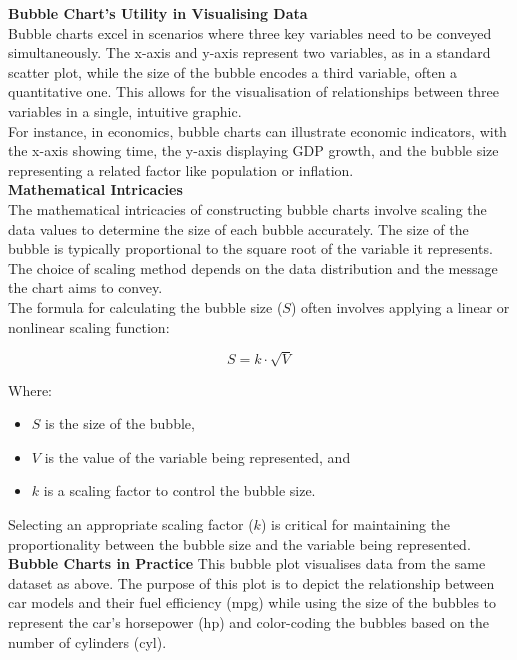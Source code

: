 \documentclass{article}\usepackage[]{graphicx}\usepackage[]{xcolor}
\begin{document}
\noindent
\textbf{Bubble Chart's Utility in Visualising Data}\\

\noindent
Bubble charts excel in scenarios where three key variables need to be conveyed simultaneously. The x-axis and y-axis represent two variables, as in a standard scatter plot, while the size of the bubble encodes a third variable, often a quantitative one. This allows for the visualisation of relationships between three variables in a single, intuitive graphic.\\

\noindent
For instance, in economics, bubble charts can illustrate economic indicators, with the x-axis showing time, the y-axis displaying GDP growth, and the bubble size representing a related factor like population or inflation.\\

\noindent
\textbf{Mathematical Intricacies}\\

\noindent
The mathematical intricacies of constructing bubble charts involve scaling the data values to determine the size of each bubble accurately. The size of the bubble is typically proportional to the square root of the variable it represents. The choice of scaling method depends on the data distribution and the message the chart aims to convey.\\

\noindent
The formula for calculating the bubble size (\(S\)) often involves applying a linear or nonlinear scaling function:

\[
S = k \cdot \sqrt{V}
\]

Where:
\begin{itemize}
\item \(S\) is the size of the bubble,
\item \(V\) is the value of the variable being represented, and
\item \(k\) is a scaling factor to control the bubble size.
\end{itemize}

Selecting an appropriate scaling factor (\(k\)) is critical for maintaining the proportionality between the bubble size and the variable being represented.\\

\noindent
\textbf{Bubble Charts in Practice}
 This bubble plot visualises data from the same dataset as above. The purpose of this plot is to depict the relationship between car models and their fuel efficiency (mpg) while using the size of the bubbles to represent the car's horsepower (hp) and color-coding the bubbles based on the number of cylinders (cyl).
\end{document}
